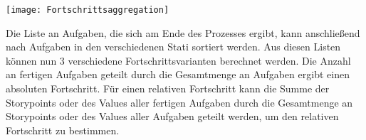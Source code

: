 \vspace{20pt}
\begin{center}
    \begin{minipage}{0.8\linewidth}
        \texttt{[image: Fortschrittsaggregation]}
    \end{minipage}
\end{center}
\vspace{20pt}

Die Liste an Aufgaben, die sich am Ende des Prozesses ergibt, kann anschließend nach Aufgaben in den verschiedenen Stati sortiert werden. Aus diesen Listen können nun 3 verschiedene Fortschrittsvarianten berechnet werden. Die Anzahl an fertigen Aufgaben geteilt durch die Gesamtmenge an Aufgaben ergibt einen absoluten Fortschritt. Für einen relativen Fortschritt kann die Summe der Storypoints oder des Values aller fertigen Aufgaben durch die Gesamtmenge an Storypoints oder des Values aller Aufgaben geteilt werden, um den relativen Fortschritt zu bestimmen.
